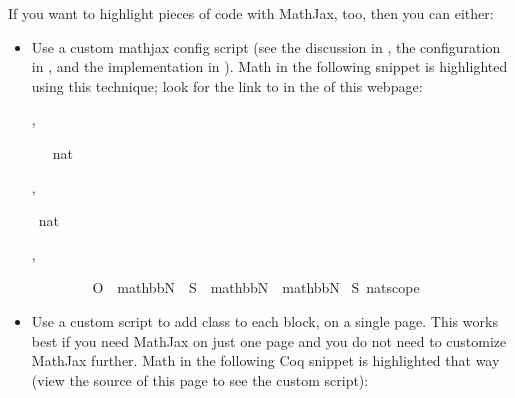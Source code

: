 \documentclass[letterpaper,10pt,english]{sphinxmanual}
\begin{document}
\sphinxAtStartPar
If you want to highlight pieces of code with MathJax, too, then you can either:
\begin{itemize}
\item {} 
\sphinxAtStartPar
Use a custom mathjax config script (see the discussion in , the configuration in , and the implementation in ).  Math in the following snippet is highlighted using this technique; look for the link to  in the  of this webpage:

\begin{alectryon}
  \sep
  \begin{sentence}
    \begin{input}
      ~~~nat\nl
    \end{input}
  \end{sentence}
  \sep
  \begin{sentence}
    \begin{input}
      ~nat
    \end{input}
    \sep
    \begin{output}
      \begin{messages}
        \begin{message}
          ~~~~\nl
          ~~~~O~~mathbbN~~S~~mathbbN~~mathbbN\nl
          \nl
          ~S~\PYGZus{}nat\PYGZus{}scope
        \end{message}
      \end{messages}
    \end{output}
  \end{sentence}
\end{alectryon}

\item {} 
\sphinxAtStartPar
Use a custom script to add class  to each  block, on a single page.  This works best if you need MathJax on just one page and you do not need to customize MathJax further.  Math in the following Coq snippet is highlighted that way (view the source of this page to see the custom script):




\end{itemize}
\end{document}
